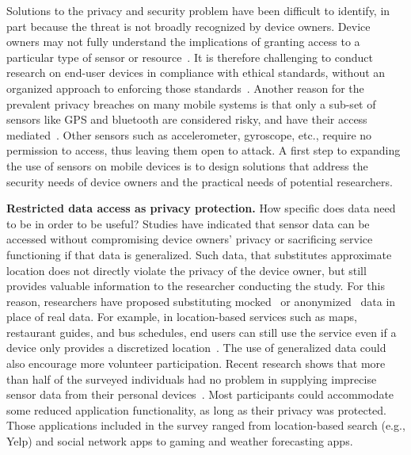 Solutions to the privacy and security problem have been difficult to 
identify, in part because the threat is not broadly recognized by device 
owners. Device owners may not fully 
understand the implications of granting access to a particular type of 
sensor or resource~\cite{felt2012android}. It is therefore challenging to 
conduct research on end-user devices in compliance with ethical standards, 
without an organized approach to enforcing those 
standards~\cite{zevenbergen2013ethical}. Another reason for 
the prevalent privacy breaches on many mobile systems %
is that only a sub-set of sensors like GPS and bluetooth are considered risky, 	
and have their access mediated~\cite{android-sec}. Other sensors 
such as accelerometer, gyroscope, etc., require no permission to access, 
thus leaving them open to attack. A first step to expanding the use of sensors on mobile devices is to design solutions that address the security needs of device owners and the practical needs of potential researchers.

\textbf{Restricted data access as privacy protection.}
How specific does data need to be in order to be useful? Studies have indicated that 
sensor data can be accessed without compromising device 
owners' privacy or sacrificing service functioning if that data is generalized. 
Such data, that substitutes approximate location does not 
directly violate the privacy of the device owner, but still provides 
valuable information to the researcher conducting the study.
For this reason, researchers have proposed 
substituting mocked~\cite{beresford2011mockdroid} or 
anonymized~\cite{zhou2011taming} data in place of real data. 
For example, in location-based services such as maps, 
restaurant guides, and bus schedules, end users can still use the 
service even if a device only provides a discretized 
location~\cite{amini2011cache, krumm2007inference}. The use of 
generalized data could also encourage more volunteer participation. 
Recent research shows that more than half of the 
surveyed individuals had no problem in supplying imprecise 
sensor data from their personal devices~\cite{fawaz2014location}. 
Most participants could accommodate some reduced application 
functionality, as long as their privacy was protected. Those 
applications included in the survey
ranged from location-based search (e.g., Yelp) and social 
network apps to gaming and weather forecasting apps. 


